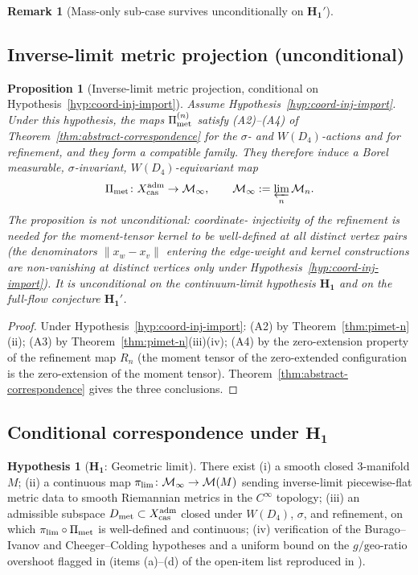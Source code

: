\documentclass[11pt, a4paper]{amsart}
\newtheorem{proposition}[theorem]{Proposition}
\theoremstyle{definition}
\newtheorem{remark}[theorem]{Remark}
\newtheorem{hypothesis}[theorem]{Hypothesis}
\newcommand{\cas}{{\rm cas}}
\newcommand{\met}{{\rm met}}
\begin{document}
\begin{remark}[Mass-only sub-case survives unconditionally on $\mathbf{H_1'}$]
\subsection{Inverse-limit metric projection (unconditional)}
\label{subsec:pimet-pihyd-inv}

\begin{proposition}[Inverse-limit metric projection, conditional on Hypothesis~\ref{hyp:coord-inj-import}]
\label{prop:pimet-inv-lim}
\emph{Assume Hypothesis~\ref{hyp:coord-inj-import}.} Under this
hypothesis, the maps $\Pi_{\met}^{(n)}$ satisfy (A2)--(A4) of
Theorem~\ref{thm:abstract-correspondence} for the $\sigma$- and
$W(D_4)$-actions and for refinement, and they form a compatible
family. They therefore induce a Borel measurable,
$\sigma$-invariant, $W(D_4)$-equivariant map
\[
  \Pi_{\met} \colon X_\cas^{\rm adm} \to \mathcal{M}_\infty,
  \qquad \mathcal{M}_\infty := \varprojlim_n \mathcal{M}_n.
\]
The proposition is \emph{not} unconditional: coordinate-
injectivity of the refinement is needed for the moment-tensor
kernel to be well-defined at all distinct vertex pairs (the
denominators $\|x_w - x_v\|$ entering the edge-weight and kernel
constructions are non-vanishing at distinct vertices only under
Hypothesis~\ref{hyp:coord-inj-import}). It is unconditional on the
continuum-limit hypothesis $\mathbf{H_1}$ and on the full-flow
conjecture $\mathbf{H_1'}$.
\end{proposition}

\begin{proof}
Under Hypothesis~\ref{hyp:coord-inj-import}: (A2) by
Theorem~\ref{thm:pimet-n}(ii); (A3) by
Theorem~\ref{thm:pimet-n}(iii)(iv); (A4) by the zero-extension
property of the refinement map $R_n$ (the moment tensor of the
zero-extended configuration is the zero-extension of the moment
tensor). Theorem~\ref{thm:abstract-correspondence} gives the three
conclusions.
\end{proof}

\subsection{Conditional correspondence under $\mathbf{H_1}$}
\label{subsec:H1}

\begin{hypothesis}[$\mathbf{H_1}$: Geometric limit]
\label{hyp:H1}
There exist (i) a smooth closed $3$-manifold $M$; (ii) a continuous
map $\pi_{\rm lim} \colon \mathcal{M}_\infty \to \mathcal{M}(M)$
sending inverse-limit piecewise-flat metric data to smooth
Riemannian metrics in the $C^\infty$ topology; (iii) an admissible
subspace $D_{\met} \subset X_\cas^{\rm adm}$ closed under $W(D_4)$,
$\sigma$, and refinement, on which $\pi_{\rm lim} \circ \Pi_{\met}$
is well-defined and continuous; (iv) verification of the
Burago--Ivanov and Cheeger--Colding hypotheses and a uniform bound
on the $g/\mathrm{geo}$-ratio overshoot flagged in
\cite[\S C2.bis]{CascadeGR} (items (a)--(d) of the open-item list
reproduced in \cite{MillenniumPoincare}).
\end{hypothesis}


\end{remark}
\end{document}
